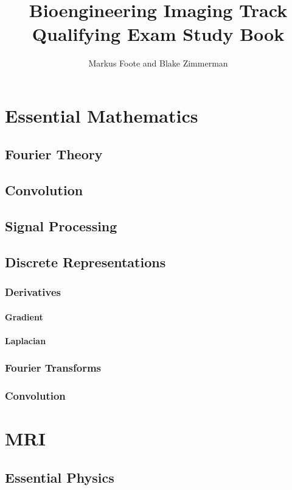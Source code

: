 \documentclass{book}
\title{Bioengineering Imaging Track Qualifying Exam Study Book}
\author{Markus Foote and Blake Zimmerman}
\begin{document}
	\maketitle
	\tableofcontents
		\part{Essential Mathematics}
			\chapter{Fourier Theory}
			\chapter{Convolution}
			\chapter{Signal Processing}
			\chapter{Discrete Representations}
				\section{Derivatives}
					\subsection{Gradient}
					\subsection{Laplacian}
				\section{Fourier Transforms}
				\section{Convolution}
				
		\part{MRI}
			\chapter{Essential Physics}
\end{document}
